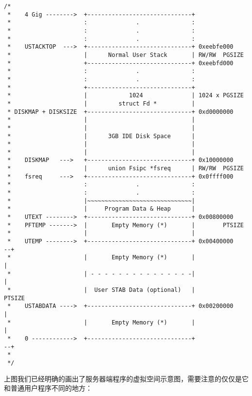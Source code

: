 \documentclass{article}
\begin{document}
\begin{CJK*}{UTF8}{gkai}
\begin{lstlisting}[style=ccode]
/*
 *    4 Gig -------->  +------------------------------+
 *                     :              .               :
 *                     :              .               :
 *                     :              .               :
 *    USTACKTOP  --->  +------------------------------+ 0xeebfe000
 *                     |      Normal User Stack       | RW/RW  PGSIZE
 *                     +------------------------------+ 0xeebfd000
 *                     :              .               :
 *                     :              .               :
 *                     +------------------------------+ 
 *                     |            1024              | 1024 x PGSIZE
 *                     |         struct Fd *          | 
 * DISKMAP + DISKSIZE  +------------------------------+ 0xd0000000
 *                     |                              | 
 *                     |                              | 
 *                     |      3GB IDE Disk Space      |
 *                     |                              | 
 *                     |                              | 
 *    DISKMAP   --->   +------------------------------+ 0x10000000
 *                     |      union Fsipc *fsreq      | RW/RW  PGSIZE
 *    fsreq     --->   +------------------------------+ 0x0ffff000
 *                     :              .               :
 *                     :              .               :
 *                     |~~~~~~~~~~~~~~~~~~~~~~~~~~~~~~|
 *                     |     Program Data & Heap      |
 *    UTEXT -------->  +------------------------------+ 0x00800000
 *    PFTEMP ------->  |       Empty Memory (*)       |        PTSIZE
 *                     |                              |
 *    UTEMP -------->  +------------------------------+ 0x00400000      --+
 *                     |       Empty Memory (*)       |                   |
 *                     | - - - - - - - - - - - - - - -|                   |
 *                     |  User STAB Data (optional)   |                 PTSIZE
 *    USTABDATA ---->  +------------------------------+ 0x00200000        |
 *                     |       Empty Memory (*)       |                   |
 *    0 ------------>  +------------------------------+                 --+
 *
 */
\end{lstlisting}

上图我们已经明确的画出了服务器端程序的虚拟空间示意图，需要注意的仅仅是它和普通用户程序不同的地方：


\end{CJK*}
\end{document}

